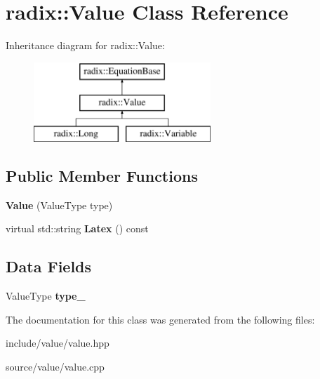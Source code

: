 \hypertarget{classradix_1_1Value}{}\section{radix\+:\+:Value Class Reference}
\label{classradix_1_1Value}
Inheritance diagram for radix\+:\+:Value\+:\begin{figure}[H]
\begin{center}
\leavevmode
\includegraphics[height=3.000000cm]{classradix_1_1Value}
\end{center}
\end{figure}
\subsection*{Public Member Functions}
\begin{DoxyCompactItemize}
\item 
\mbox{\label{classradix_1_1Value_abe99ba991c4009aca8ab9a775d461a11}} 
{\bfseries Value} (Value\+Type type)
\item 
\mbox{\label{classradix_1_1Value_a2eac6c73b8e2a8131407bca685b05299}} 
virtual std\+::string {\bfseries Latex} () const
\end{DoxyCompactItemize}
\subsection*{Data Fields}
\begin{DoxyCompactItemize}
\item 
\mbox{\label{classradix_1_1Value_a5f6d52b7c39af605d22e7af2b777e045}} 
Value\+Type {\bfseries type\+\_\+}
\end{DoxyCompactItemize}


The documentation for this class was generated from the following files\+:\begin{DoxyCompactItemize}
\item 
include/value/value.\+hpp\item 
source/value/value.\+cpp\end{DoxyCompactItemize}
